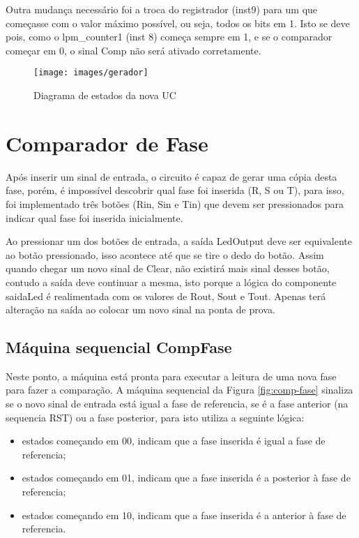 \documentclass[12pt,a4paper,openany]{abntex2}
\begin{document}
Outra mudança necessário foi a troca do registrador (inst9) para um que começasse com o valor máximo possível, ou seja, todos os bits em 1. Isto se deve pois, como o lpm\_counter1 (inst 8) começa sempre em 1, e se o comparador começar em 0, o sinal Comp não será ativado corretamente.

\begin{figure}[!htp]
	\centering
	\caption{Diagrama de estados da nova UC}
	\texttt{[image: images/gerador]}
	\label{fig:gerador}
\end{figure}

\section{Comparador de Fase}

Após inserir um sinal de entrada, o circuito é capaz de gerar uma cópia desta fase, porém, é impossível descobrir qual fase foi inserida (R, S ou T), para isso, foi implementado três botões (Rin, Sin e Tin) que devem ser pressionados para indicar qual fase foi inserida inicialmente.

Ao pressionar um dos botões de entrada, a saída LedOutput deve ser equivalente ao botão pressionado, isso acontece até que se tire o dedo do botão. Assim quando chegar um novo sinal de Clear, não existirá mais sinal desses botão, contudo a saída deve continuar a mesma, isto porque a lógica do componente saidaLed é realimentada com os valores de Rout, Sout e Tout. Apenas terá alteração na saída ao colocar um novo sinal na ponta de prova.

\subsection{Máquina sequencial CompFase}

Neste ponto, a máquina está pronta para executar a leitura de uma nova fase para fazer a comparação. A máquina sequencial da Figura \ref{fig:comp-fase} sinaliza se o novo sinal de entrada está igual a fase de referencia, se é a fase anterior (na sequencia RST) ou a fase posterior, para isto utiliza a seguinte lógica:
\begin{itemize}
	\item estados começando em 00, indicam que a fase inserida é igual a fase de referencia;
	\item estados começando em 01, indicam que a fase inserida é a posterior à fase de referencia;
	\item estados começando em 10, indicam que a fase inserida é a anterior à fase de referencia.
\end{itemize}
\end{document}
